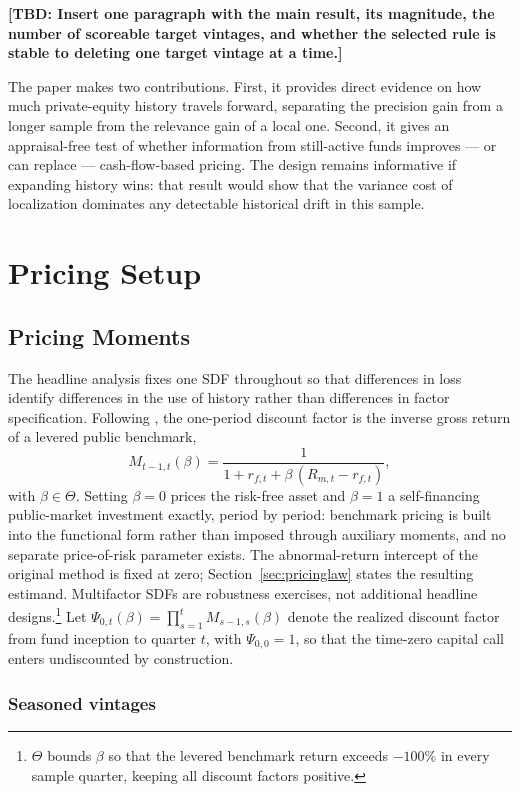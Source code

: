 \documentclass[11pt]{article}
\newcommand{\tbd}[1]{\textbf{[TBD: #1]}}
\begin{document}
\tbd{Insert one paragraph with the main result, its magnitude, the number of
scoreable target vintages, and whether the selected rule is stable to deleting
one target vintage at a time.}

The paper makes two contributions. First, it provides direct evidence on how
much private-equity history travels forward, separating the precision gain
from a longer sample from the relevance gain of a local one. Second, it gives
an appraisal-free test of whether information from still-active funds improves
--- or can replace --- cash-flow-based pricing. The design remains informative
if expanding history wins: that result
would show that the variance cost of localization dominates any detectable
historical drift in this sample.

\section{Pricing Setup}

\subsection{Pricing Moments}
\label{sec:moments}

The headline analysis fixes one SDF throughout so that differences in loss
identify differences in the use of history rather than differences in factor
specification. Following \citet{DriessenLinPhalippou2012}, the one-period
discount factor is the inverse gross return of a levered public benchmark,
\[
M_{t-1,t}(\beta)
=
\frac{1}{1+r_{f,t}+\beta\,(R_{m,t}-r_{f,t})},
\]
with $\beta\in\Theta$. Setting $\beta=0$ prices the
risk-free asset and $\beta=1$ a self-financing public-market investment
exactly, period by period: benchmark pricing is built into the functional
form rather than imposed through auxiliary moments, and no separate
price-of-risk parameter exists. The abnormal-return intercept of the
original method is fixed at zero; Section~\ref{sec:pricinglaw} states the
resulting estimand. Multifactor SDFs are robustness exercises, not additional
headline designs.\footnote{$\Theta$ bounds $\beta$ so that the levered
benchmark return exceeds $-100\%$ in every sample quarter, keeping all
discount factors positive.} Let
$\Psi_{0,t}(\beta)=\prod_{s=1}^{t}M_{s-1,s}(\beta)$ denote the realized
discount factor from fund inception to quarter $t$, with $\Psi_{0,0}=1$, so
that the time-zero capital call enters undiscounted by construction.

\subsubsection{Seasoned vintages}
\end{document}
